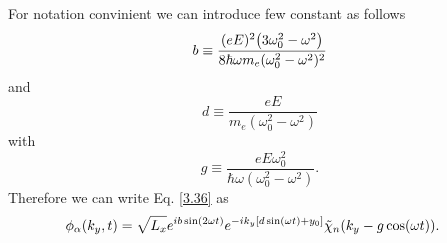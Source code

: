 For notation convinient we can introduce few constant as follows
\begin{equation} \label{3.37}
  b \equiv
  \frac{(eE)^2\qty(3\omega_0^2 - \omega^2)}{8\hbar \omega m_e(\omega_0^2 - \omega^2)^2}
\end{equation}
and
\begin{equation} \label{3.38}
  d \equiv
  \frac{eE}{m_e(\omega_0^2 - \omega^2)}
\end{equation}
with
\begin{equation} \label{3.39}
  g \equiv
  \frac{eE\omega_0^2}{\hbar\omega(\omega_0^2 - \omega^2)}.
\end{equation}
Therefore we can write Eq. \eqref{3.36} as
\begin{equation} \label{3.40}
  \begin{aligned}
    \phi_{\alpha}(k_y,t) & =
    {\sqrt{L_x}}
    e^{
      ib\sin(2\omega t)
    }
    e^{
      -ik_y  \qty[d\sin(\omega t) + y_0]
    }
    \tilde{\chi}_{n}\qty(k_y -g\cos(\omega t)).
  \end{aligned}
\end{equation}
